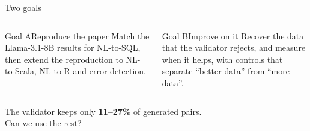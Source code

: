 \documentclass[11pt,aspectratio=169]{beamer}
\begin{document}
\begin{frame}{Two goals}
\vspace{0.2cm}
\begin{columns}[T]
\begin{tscard}[tsnavy]{Goal A}{Reproduce the paper}
Match the Llama-3.1-8B results for NL-to-SQL, then extend the reproduction to NL-to-Scala, NL-to-R and error detection.
\end{tscard}
\begin{tscard}[tsred]{Goal B}{Improve on it}
Recover the data that the validator rejects, and measure when it helps, with controls that separate ``better data'' from ``more data''.
\end{tscard}
\end{columns}
\vspace{0.5cm}
\begin{tscallout}[tspink]
\Large The validator keeps only \textbf{\color{tsred}11--27\%} of generated pairs.\\[2pt] Can we use the rest?
\end{tscallout}
\end{frame}
\end{document}
